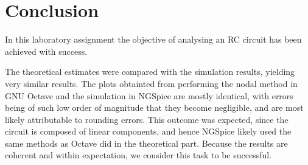 \section{Conclusion}
\label{sec:conclusion}

\pargraph In this laboratory assignment the objective of analysing an RC circuit has been
achieved with success. 

The theoretical estimates were compared with the simulation results, yielding very similar results. The plots obtainted from performing the nodal method in
 GNU Octave and the simulation in NGSpice are mostly identical, with errors being of such low order of magnitude that they become negligible,
 and are most likely attributable to rounding errors. This outcome was expected, since the circuit is composed of linear components, and hence NGSpice likely 
used the same methods as Octave did in the theoretical part. Because the results are coherent and within expectation, we consider this task to be successful.

